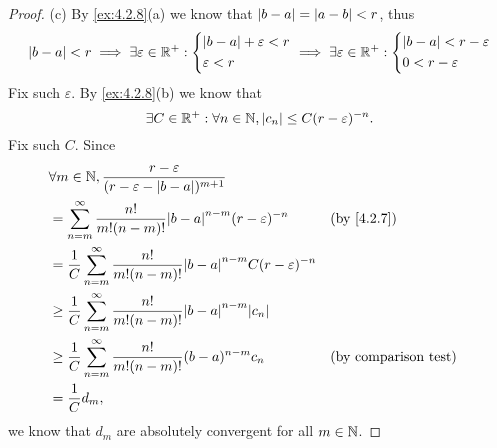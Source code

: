 \begin{proof}{(c)}
  By \cref{ex:4.2.8}(a) we know that \(\left\lvert b - a\right\rvert = \left\lvert a - b\right\rvert < r\), thus
  \[
    \left\lvert b - a\right\rvert < r \implies \exists \varepsilon \in \mathbb{R}^+ : \begin{dcases}
      \left\lvert b - a\right\rvert + \varepsilon < r \\
      \varepsilon < r
    \end{dcases} \implies \exists \varepsilon \in \mathbb{R}^+ : \begin{dcases}
      \left\lvert b - a\right\rvert < r - \varepsilon \\
      0 < r - \varepsilon
    \end{dcases}
  \]
  Fix such \(\varepsilon\).
  By \cref{ex:4.2.8}(b) we know that
  \[
    \exists C \in \mathbb{R}^+ : \forall n \in \mathbb{N}, \left\lvert c_n\right\rvert \leq C (r - \varepsilon)^{-n}.
  \]
  Fix such \(C\).
  Since
  \begin{align*}
     & \forall m \in \N, \dfrac{r - \varepsilon}{(r - \varepsilon - \abs{b - a})^{m + 1}}                                                       \\
     & = \sum_{n = m}^\infty \dfrac{n!}{m! (n - m)!} \abs{b - a}^{n - m} (r - \varepsilon)^{-n}                &  & \by{4.2.7}                  \\
     & = \dfrac{1}{C} \sum_{n = m}^\infty \dfrac{n!}{m! (n - m)!} \abs{b - a}^{n - m} C (r - \varepsilon)^{-n}                                  \\
     & \geq \dfrac{1}{C} \sum_{n = m}^\infty \dfrac{n!}{m! (n - m)!} \abs{b - a}^{n - m} \abs{c_n}                                              \\
     & \geq \dfrac{1}{C} \sum_{n = m}^\infty \dfrac{n!}{m! (n - m)!} (b - a)^{n - m} c_n                       &  & \text{(by comparison test)} \\
     & = \dfrac{1}{C} d_m,
  \end{align*}
  we know that \(d_m\) are absolutely convergent for all \(m \in \mathbb{N}\).
\end{proof}

